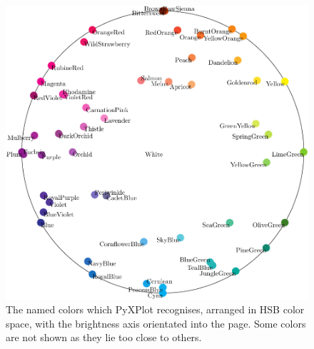 \begin{figure}
\begin{center}
\includegraphics[width=\textwidth]{figures/pyx_colors}
\end{center}
\caption[The named colors which PyXPlot recognises, arranged in HSB color space]
{The named colors which PyXPlot recognises, arranged in HSB color space, with the brightness axis orientated into the page. Some colors are not shown as they lie too close to others.}
\label{fig:color_table3}
\end{figure}

